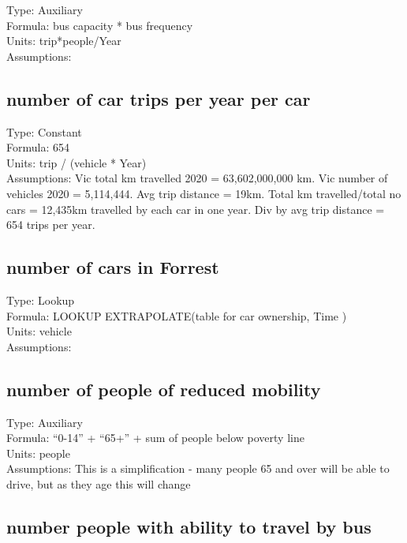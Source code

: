 \documentclass[
  11pt,
]{book}
\begin{document}
Type: Auxiliary\\
Formula: bus capacity * bus frequency\\
Units: trip*people/Year\\
Assumptions:

\hypertarget{number-of-car-trips-per-year-per-car}{%
\subsection{number of car trips per year per car}\label{number-of-car-trips-per-year-per-car}}

Type: Constant\\
Formula: 654\\
Units: trip / (vehicle * Year)\\
Assumptions: Vic total km travelled 2020 = 63,602,000,000 km. Vic number of vehicles 2020 = 5,114,444. Avg trip distance = 19km. Total km travelled/total no cars = 12,435km travelled by each car in one year. Div by avg trip distance = 654 trips per year.

\hypertarget{number-of-cars-in-forrest}{%
\subsection{number of cars in Forrest}\label{number-of-cars-in-forrest}}

Type: Lookup\\
Formula: LOOKUP EXTRAPOLATE(table for car ownership, Time )\\
Units: vehicle\\
Assumptions:

\hypertarget{number-of-people-of-reduced-mobility}{%
\subsection{number of people of reduced mobility}\label{number-of-people-of-reduced-mobility}}

Type: Auxiliary\\
Formula: ``0-14'' + ``65+'' + sum of people below poverty line\\
Units: people\\
Assumptions: This is a simplification - many people 65 and over will be able to drive, but as they age this will change

\hypertarget{number-people-with-ability-to-travel-by-bus}{%
\subsection{number people with ability to travel by bus}\label{number-people-with-ability-to-travel-by-bus}}
\end{document}
